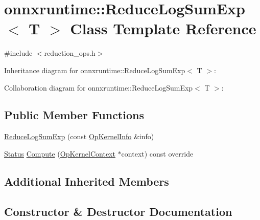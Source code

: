 \hypertarget{classonnxruntime_1_1ReduceLogSumExp}{}\section{onnxruntime\+:\+:Reduce\+Log\+Sum\+Exp$<$ T $>$ Class Template Reference}
\label{classonnxruntime_1_1ReduceLogSumExp}


{\ttfamily \#include $<$reduction\+\_\+ops.\+h$>$}



Inheritance diagram for onnxruntime\+:\+:Reduce\+Log\+Sum\+Exp$<$ T $>$\+:


Collaboration diagram for onnxruntime\+:\+:Reduce\+Log\+Sum\+Exp$<$ T $>$\+:
\subsection*{Public Member Functions}
\begin{DoxyCompactItemize}
\item 
\mbox{\hyperlink{classonnxruntime_1_1ReduceLogSumExp_ac98583e3b00a8d34f86bd959dcbd2249}{Reduce\+Log\+Sum\+Exp}} (const \mbox{\hyperlink{classonnxruntime_1_1OpKernelInfo}{Op\+Kernel\+Info}} \&info)
\item 
\mbox{\hyperlink{classonnxruntime_1_1common_1_1Status}{Status}} \mbox{\hyperlink{classonnxruntime_1_1ReduceLogSumExp_a822206beea2ef462036d53169b7a3dd7}{Compute}} (\mbox{\hyperlink{classonnxruntime_1_1OpKernelContext}{Op\+Kernel\+Context}} $\ast$context) const override
\end{DoxyCompactItemize}
\subsection*{Additional Inherited Members}


\subsection{Constructor \& Destructor Documentation}
\mbox{\label{classonnxruntime_1_1ReduceLogSumExp_ac98583e3b00a8d34f86bd959dcbd2249}} 
